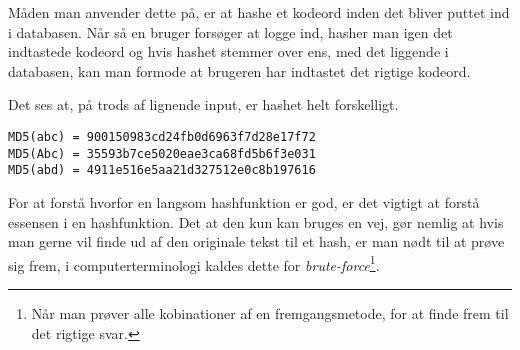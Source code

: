 Måden man anvender dette på, er at hashe et kodeord inden det bliver puttet ind i databasen.
Når så en bruger forsøger at logge ind, hasher man igen det indtastede kodeord og hvis hashet stemmer over ens, med det liggende i databasen, kan man formode at brugeren har indtastet det rigtige kodeord.

\begin{eks}
    \label{eks:hash}
    Det ses at, på trods af lignende input, er hashet helt forskelligt.
    \begin{center}
        \texttt{MD5(abc) = 900150983cd24fb0d6963f7d28e17f72}\\
        \texttt{MD5(Abc) = 35593b7ce5020eae3ca68fd5b6f3e031}\\
        \texttt{MD5(abd) = 4911e516e5aa21d327512e0c8b197616}\\
    \end{center}
\end{eks}
For at forstå hvorfor en langsom hashfunktion er god, er det vigtigt at forstå essensen i en hashfunktion.
Det at den kun kan bruges en vej, gør nemlig at hvis man gerne vil finde ud af den originale tekst til et hash, er man nødt til at prøve sig frem, i computerterminologi kaldes dette for \emph{brute-force}\footnote{Når man prøver alle kobinationer af en fremgangsmetode, for at finde frem til det rigtige svar.}.


